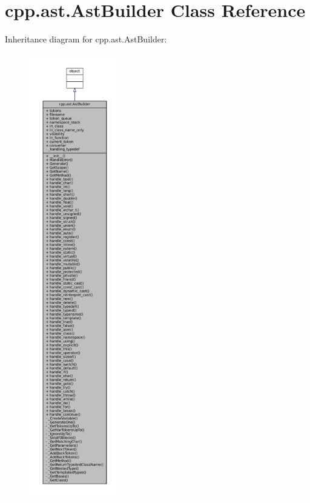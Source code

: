\hypertarget{classcpp_1_1ast_1_1AstBuilder}{}\section{cpp.\+ast.\+Ast\+Builder Class Reference}
\label{classcpp_1_1ast_1_1AstBuilder}


Inheritance diagram for cpp.\+ast.\+Ast\+Builder\+:
\nopagebreak
\begin{figure}[H]
\begin{center}
\leavevmode
\includegraphics[height=550pt]{classcpp_1_1ast_1_1AstBuilder__inherit__graph}
\end{center}
\end{figure}


